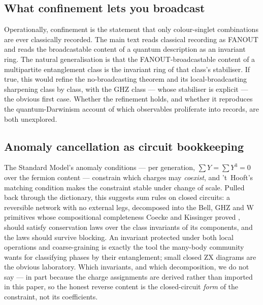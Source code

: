 \subsection{What confinement lets you broadcast}
\label{app:rev-broadcast}

Operationally, confinement is the statement that only colour-singlet combinations are
ever classically recorded. The main text reads classical recording as FANOUT and reads
the broadcastable content of a quantum description as an invariant ring. The natural
generalisation is that the FANOUT-broadcastable content of a multipartite entanglement
class is the invariant ring of that class's stabiliser. If true, this would refine the
no-broadcasting theorem \autocite{barnum1996broadcast} and its local-broadcasting
sharpening \autocite{pianihorodeckihorodecki2008local} class by class, with the GHZ
class --- whose stabiliser is explicit --- the obvious first case. Whether the
refinement holds, and whether it reproduces the quantum-Darwinism account of which
observables proliferate into records, are both unexplored.

\subsection{Anomaly cancellation as circuit bookkeeping}
\label{app:rev-anomaly}

The Standard Model's anomaly conditions --- per generation, $\sum Y = \sum Y^{3} = 0$
over the fermion content --- constrain which charges may \emph{coexist}, and 't~Hooft's
matching condition \autocite{thooft1980naturalness} makes the constraint stable under
change of scale. Pulled back through the dictionary, this suggests sum rules on closed
circuits: a reversible network with no external legs, decomposed into the Bell, GHZ and
W primitives whose compositional completeness Coecke and Kissinger proved
\autocite{coeckekissinger2010compositional}, should satisfy conservation laws over the
class invariants of its components, and the laws should survive blocking. An invariant
protected under both local operations and coarse-graining is exactly the tool the
many-body community wants for classifying phases by their entanglement; small closed ZX
diagrams are the obvious laboratory. Which invariants, and which decomposition, we do
not say --- in part because the charge assignments are derived rather than imported in
this paper, so the honest reverse content is the closed-circuit \emph{form} of the
constraint, not its coefficients.

